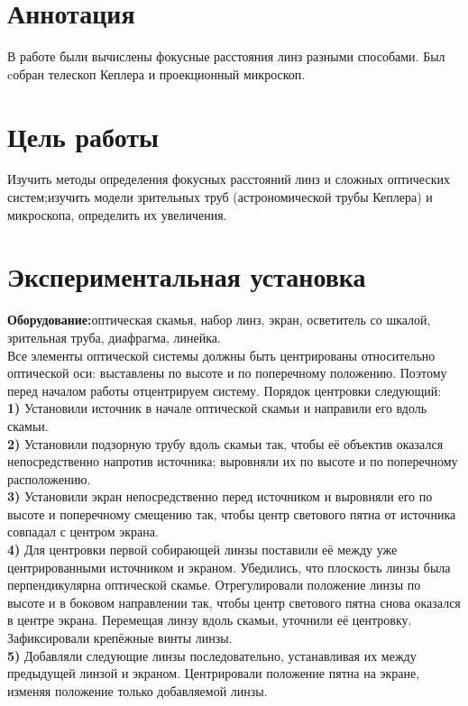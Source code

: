 \section*{Аннотация}
В работе были вычислены фокусные расстояния линз разными способами. Был cобран телескоп Кеплера и проекционный микроскоп.
\section*{Цель работы}
Изучить методы определения фокусных расстояний линз и сложных оптических систем;изучить модели зрительных труб (астрономической трубы Кеплера) и микроскопа, определить их увеличения.
\section*{Экспериментальная установка}
\textbf{Оборудование:}оптическая скамья, набор линз, экран, осветитель со шкалой, зрительная труба, диафрагма, линейка.\\

\indent Все элементы оптической системы должны быть центрированы относительно оптической оси: выставлены по высоте и по поперечному положению. Поэтому перед началом работы отцентрируем систему. Порядок центровки следующий:\\

\noindent\textbf{1)} Установили источник в начале оптической скамьи и направили его вдоль скамьи.\\
\textbf{2)} Установили подзорную трубу вдоль скамьи так, чтобы её объектив оказался непосредственно напротив источника; выровняли их по высоте и по поперечному расположению.\\
\textbf{3)} Установили экран непосредственно перед источником и выровняли его по высоте и поперечному смещению так, чтобы центр светового пятна от источника совпадал с центром экрана.\\
\textbf{4)} Для центровки первой собирающей линзы поставили её между уже центрированными источником и экраном. Убедились, что плоскость линзы была перпендикулярна оптической скамье. Отрегулировали положение линзы по высоте и в боковом направлении так, чтобы центр светового пятна снова оказался в центре экрана. Перемещая линзу вдоль скамьи, уточнили её центровку. Зафиксировали крепёжные винты линзы.\\
\textbf{5)} Добавляли следующие линзы последовательно, устанавливая их между предыдущей линзой и экраном. Центрировали положение пятна на экране, изменяя положение только добавляемой линзы.\\

